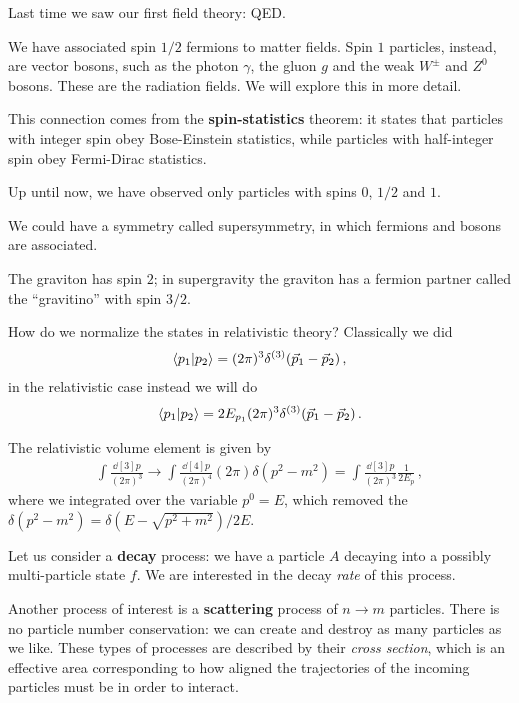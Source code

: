 \documentclass[main.tex]{subfiles}
\begin{document}

Last time we saw our first field theory: QED. 

We have associated spin \(1/2\) fermions to matter fields. 
Spin \(1\) particles, instead, are vector bosons, such as the photon \(\gamma\), the gluon \(g\) and the weak \(W^{\pm}\) and \(Z^{0}\) bosons. These are the radiation fields.  
We will explore this in more detail. 

This connection comes from the \textbf{spin-statistics} theorem: it states that particles with integer spin obey Bose-Einstein statistics, while particles with half-integer spin obey Fermi-Dirac statistics.

Up until now, we have observed only particles with spins \(0\), \(1/2\) and \(1\). 

We could have a symmetry called supersymmetry, in which fermions and bosons are associated. 

The graviton has spin \(2\); in supergravity the graviton has a fermion partner called the ``gravitino'' with spin \(3/2\). 

How do we normalize the states in relativistic theory? 
Classically we did 
%
\begin{align}
\braket{p_1 }{p_2  } = (2 \pi )^3 \delta^{(3)} (\vec{p}_{1} - \vec{p}_{2})
\,,
\end{align}
%
in the relativistic case instead we will do 
%
\begin{align}
\braket{p_1 }{p_2  } = 2 E_{p_1 } (2 \pi )^3 \delta^{(3)} (\vec{p}_{1} - \vec{p}_{2})
\,.
\end{align}

The relativistic volume element is given by 
%
\begin{align}
\int \frac{ \dd[3]{p}}{(2\pi )^3} \rightarrow
\int \frac{ \dd[4]{p}}{(2 \pi )^{4}} (2 \pi ) \delta (p^2-m^2)
= \int \frac{ \dd[3]{p}}{(2\pi )^3} \frac{1}{2E_p}
\,,
\end{align}
%
where we integrated over the variable \(p^{0}=E\), which removed the \(\delta (p^2-m^2) = \delta (E - \sqrt{p^2+m^2}) / 2E\). 

Let us consider a \textbf{decay} process: we have a particle \(A\) decaying into a possibly multi-particle state \(f\). 
We are interested in the decay \emph{rate} of this process. 

Another process of interest is a \textbf{scattering} process of \(n \to m \) particles. 
There is no particle number conservation: we can create and destroy as many particles as we like. 
These types of processes are described by their \emph{cross section}, which is an effective area corresponding to how aligned the trajectories of the incoming particles must be in order to interact.
\end{document}
